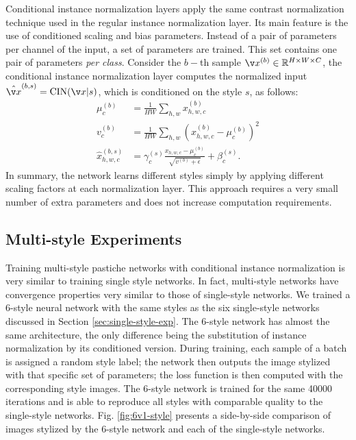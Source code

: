 Conditional instance normalization layers apply the same contrast normalization technique used in the regular instance normalization layer. Its main feature is the use of conditioned scaling and bias parameters. Instead of a pair of parameters per channel of the input, a set of parameters are trained. This set contains one pair of parameters \textit{per class}. Consider the $b-$th sample $\v x^{(b)} \in \mathbb{R}^{H\times W\times C}$, the conditional instance normalization layer computes the normalized input $\hat{\v x}^{(b, s)} = \text{CIN}(\v x| s)$, which is conditioned on the style $s$, as follows:
\begin{equation}
\begin{split}
	\mu_c^{(b)} &= \frac{1}{HW}\sum_{h,w}x^{(b)}_{h,w,c}\\
	v_c^{(b)} &= \frac{1}{HW}\sum_{h,w}\left(x^{(b)}_{h,w,c} - \mu_c^{(b)}\right)^2\\
	\hat{x}^{(b,s)}_{h,w,c} &= \gamma^{(s)}_c\frac{x_{h,w,c} - \mu_c^{(b)}}{\sqrt{v^{(b)} + \epsilon}} + \beta^{(s)}_c.
\end{split}
\end{equation}
In summary, the network learns different styles simply by applying different scaling factors at each normalization layer. This approach requires a very small number of extra parameters and does not increase computation requirements.

\subsection{Multi-style Experiments}
Training multi-style pastiche networks with conditional instance normalization is very similar to training single style networks. In fact, multi-style networks have convergence properties very similar to those of single-style networks. We trained a 6-style neural network with the same styles as the six single-style networks discussed in Section \ref{sec:single-style-exp}. The 6-style network has almost the same architecture, the only difference being the substitution of instance normalization by its conditioned version. During training, each sample of a batch is assigned a random style label; the network then outputs the image stylized with that specific set of parameters; the loss function is then computed with the corresponding style images. The 6-style network is trained for the same 40000 iterations and is able to reproduce all styles with comparable quality to the single-style networks. Fig. \ref{fig:6v1-style} presents a side-by-side comparison of images stylized by the 6-style network and each of the single-style networks.

